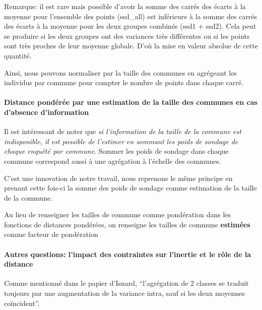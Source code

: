 \documentclass[
]{article}
\begin{document}
Remarque: il est rare mais possible d'avoir la somme des carrés des
écarts à la moyenne pour l'ensemble des points (ssd\_all) est inférieure
à la somme des carrés des écarts à la moyenne pour les deux groupes
combinés (ssd1 + ssd2). Cela peut se produire si les deux groupes ont
des variances très différentes ou si les points sont très proches de
leur moyenne globale. D'où la mise en valeur absolue de cette quantité.

Ainsi, nous pouvons normaliser par la taille des communes en agrégeant
les individus par commune pour compter le nombre de points dans chaque
carré.

\hypertarget{distance-ponduxe9ruxe9e-par-une-estimation-de-la-taille-des-communes-en-cas-dabsence-dinformation}{%
\paragraph{Distance pondérée par une estimation de la taille des
communes en cas d'absence
d'information}\label{distance-ponduxe9ruxe9e-par-une-estimation-de-la-taille-des-communes-en-cas-dabsence-dinformation}}

Il est intéressant de noter que \emph{si l'information de la taille de
la commune est indisponible, il est possible de l'estimer en sommant les
poids de sondage de chaque enquêté par commune}. Sommer les poids de
sondage dans chaque commune correspond aussi à une agrégation à
l'échelle des communes.

C'est une innovation de notre travail, nous reprenons le même principe
en prenant cette fois-ci la somme des poids de sondage comme estimation
de la taille de la commune.

Au lieu de renseigner les tailles de commune comme pondération dans les
fonctions de distances pondérées, on renseigne les tailles de commune
\textbf{estimées} comme facteur de pondération

\hypertarget{autres-questions-limpact-des-contraintes-sur-linertie-et-le-ruxf4le-de-la-distance}{%
\paragraph{Autres questions: l'impact des contraintes sur l'inertie et
le rôle de la
distance}\label{autres-questions-limpact-des-contraintes-sur-linertie-et-le-ruxf4le-de-la-distance}}

Comme mentionné dans le papier d'Isnard, ``l'agrégation de 2 classes se
traduit toujours par une augmentation de la variance intra, sauf si les
deux moyennes coïncident''.
\end{document}
